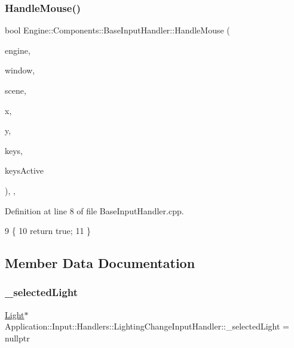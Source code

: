 \subsubsection{\texorpdfstring{Handle\+Mouse()}{HandleMouse()}}
{\footnotesize\ttfamily bool Engine\+::\+Components\+::\+Base\+Input\+Handler\+::\+Handle\+Mouse (\begin{DoxyParamCaption}\item[{\mbox{\hyperlink{classEngine_1_1BaseEngine}{Base\+Engine}} $\ast$}]{engine,  }\item[{\mbox{\hyperlink{classEngine_1_1Components_1_1Window}{Window}} $\ast$}]{window,  }\item[{\mbox{\hyperlink{classEngine_1_1Components_1_1Scene}{Scene}} $\ast$}]{scene,  }\item[{double}]{x,  }\item[{double}]{y,  }\item[{\mbox{\hyperlink{classGeneric_1_1Dictionary}{Generic\+::\+Dictionary}}$<$ short, bool $>$ \&}]{keys,  }\item[{int}]{keys\+Active }\end{DoxyParamCaption})\hspace{0.3cm}{\ttfamily [override]}, {\ttfamily [virtual]}, {\ttfamily [inherited]}}



Definition at line 8 of file Base\+Input\+Handler.\+cpp.


\begin{DoxyCode}
9 \{
10     \textcolor{keywordflow}{return} \textcolor{keyword}{true};
11 \}
\end{DoxyCode}


\subsection{Member Data Documentation}
\mbox{\label{classApplication_1_1Input_1_1Handlers_1_1LightingChangeInputHandler_a9d2d27b234fd09b3add304963534b719}} 
\subsubsection{\texorpdfstring{\+\_\+selected\+Light}{\_selectedLight}}
{\footnotesize\ttfamily \mbox{\hyperlink{classLight}{Light}}$\ast$ Application\+::\+Input\+::\+Handlers\+::\+Lighting\+Change\+Input\+Handler\+::\+\_\+selected\+Light = nullptr\hspace{0.3cm}{\ttfamily [private]}}



